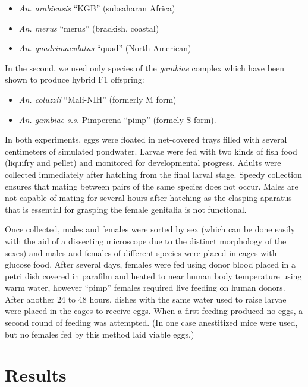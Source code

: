 \documentclass{article}
\begin{document}
\begin{itemize}
\item \emph{An. arabiensis} ``KGB'' (subsaharan Africa)
\item \emph{An. merus} ``merus'' (brackish, coastal)
\item \emph{An. quadrimaculatus} ``quad'' (North American)
\end{itemize}

In the second, we used only species of the \emph{gambiae} complex which have been shown to produce hybrid F1 offspring:

\begin{itemize}
\item \emph{An. coluzzii} ``Mali-NIH'' (formerly M form)
\item \emph{An. gambiae s.s.} Pimperena ``pimp'' (formely S form).
\end{itemize}

In both experiments, eggs were floated in net-covered trays filled with several centimeters of simulated pondwater. Larvae were fed with two kinds of fish food (liquifry and pellet) and monitored for developmental progress. Adults were collected immediately after hatching from the final larval stage. Speedy collection ensures that mating between pairs of the same species does not occur. Males are not capable of mating for several hours after hatching as the clasping aparatus that is essential for grasping the female genitalia is not functional.

Once collected, males and females were sorted by sex (which can be done easily with the aid of a dissecting microscope due to the distinct morphology of the sexes) and males and females of different species were placed in cages with glucose food. After several days, females were fed using donor blood placed in a petri dish covered in parafilm and heated to near human body temperature using warm water, however ``pimp'' females required live feeding on human donors. After another 24 to 48 hours, dishes with the same water used to raise larvae were placed in the cages to receive eggs. When a first feeding produced no eggs, a second round of feeding was attempted. (In one case anestitized mice were used, but no females fed by this method laid viable eggs.)

\section{Results}
\end{document}
